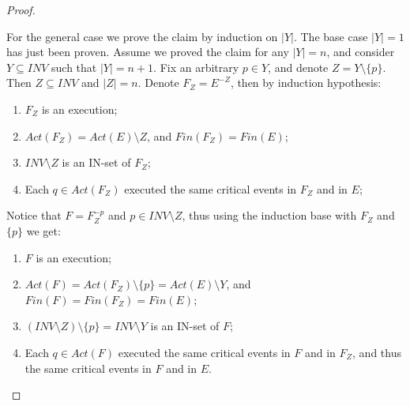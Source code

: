\begin{proof}
\begin{enumerate}
\end{enumerate}	

	For the general case we prove the claim by induction on $|Y|$. The base case $|Y| = 1$ has just been proven. Assume we proved the claim for any $|Y|=n$, and consider $Y \subseteq INV$ such that $|Y| = n+1$. Fix an arbitrary $p \in Y$, and denote $Z = Y \setminus \{p\}$. Then $Z \subseteq INV$ and $|Z|=n$. Denote $F_Z = E^{-Z}$, then by induction hypothesis:
	\begin{enumerate}
		\item $F_Z$ is an execution;
		\item $Act(F_Z) = Act(E) \setminus Z$, and $Fin(F_Z) = Fin(E)$;
		\item $INV \setminus Z$ is an IN-set of $F_Z$;
		\item Each $q \in Act(F_Z)$ executed the same critical events in $F_Z$ and in $E$;
	\end{enumerate}
	Notice that $F = F_Z^{-p}$ and $p \in INV \setminus Z$, thus using the induction base with $F_Z$ and $\{p\}$ we get:
	\begin{enumerate}
		\item $F$ is an execution;
		\item $Act(F) = Act(F_Z) \setminus \{p\} = Act(E) \setminus Y$, and $Fin(F) = Fin(F_Z) = Fin(E)$;
		\item $(INV \setminus Z) \setminus \{p\} = INV \setminus Y$ is an IN-set of $F$;
		\item Each $q \in Act(F)$ executed the same critical events in $F$ and in $F_Z$, and thus the same critical events in $F$ and in $E$.
	\end{enumerate}
\end{proof}

